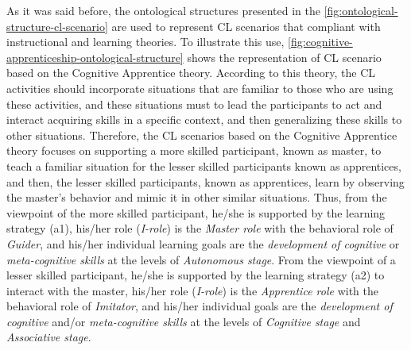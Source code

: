 As it was said before, the ontological structures presented in the \autoref{fig:ontological-structure-cl-scenario} are used to represent CL scenarios that compliant with instructional and learning theories. To illustrate this use, \autoref{fig:cognitive-apprenticeship-ontological-structure} shows the representation of CL scenario based on the Cognitive Apprentice theory. According to this theory, the CL activities should incorporate situations that are familiar to those who are using these activities, and these situations must to lead the participants to act and interact acquiring skills in a specific context, and then generalizing these skills to other situations. Therefore, the CL scenarios based on the Cognitive Apprentice theory focuses on supporting a more skilled participant, known as master, to teach a familiar situation for the lesser skilled participants known as apprentices, and then, the lesser skilled participants, known as apprentices, learn by observing the master's behavior and mimic it in other similar situations. Thus, from the viewpoint of the more skilled participant, he/she is supported by the learning strategy  (a1), his/her role (\emph{I-role}) is the \emph{Master role} with the behavioral role of \emph{Guider}, and his/her individual learning goals are the \emph{development of cognitive} or \emph{meta-cognitive skills} at the levels of \emph{Autonomous stage}. From the viewpoint of a lesser skilled participant, he/she is supported by the learning strategy  (a2) to interact with the master, his/her role (\emph{I-role}) is the \emph{Apprentice role} with the behavioral role of \emph{Imitator}, and his/her individual goals are the \emph{development of cognitive} and/or \emph{meta-cognitive skills} at the levels of \emph{Cognitive stage} and \emph{Associative stage}.

